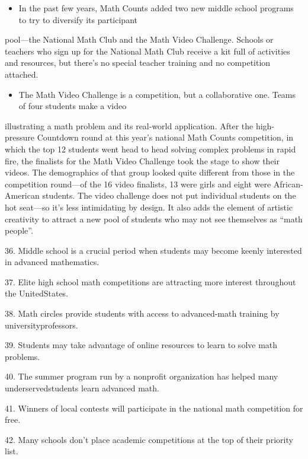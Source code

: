 \documentclass[UTF8,11pt]{ctexart}
\begin{document}
\begin{itemize}[leftmargin=2em,itemsep=.2em,topsep=.4em]\item[N.] In the past few years, Math Counts added two new middle school programs to try to diversify its participant
\end{itemize}

pool---the National Math Club and the Math Video Challenge. Schools or teachers who sign up for the National Math Club receive a kit full of activities and resources, but there’s no special teacher training and no competition attached.


\begin{itemize}[leftmargin=2em,itemsep=.2em,topsep=.4em]\item[O.] The Math Video Challenge is a competition, but a collaborative one. Teams of four students make a video
\end{itemize}

illustrating a math problem and its real-world application. After the high-pressure Countdown round at this year’s national Math Counts competition, in which the top 12 students went head to head solving complex problems in rapid fire, the finalists for the Math Video Challenge took the stage to show their videos. The demographics of that group looked quite different from those in the competition round---of the 16 video finalists, 13 were girls and eight were African-American students. The video challenge does not put individual students on the hot seat---so it’s less intimidating by design. It also adds the element of artistic creativity to attract a new pool of students who may not see themselves as “math people”.


36. Middle school is a crucial period when students may become keenly interested in advanced mathematics.


37. Elite high school math competitions are attracting more interest throughout the UnitedStates.


38. Math circles provide students with access to advanced-math training by universityprofessors.


39. Students may take advantage of online resources to learn to solve math problems.


40. The summer program run by a nonprofit organization has helped many underservedstudents learn advanced math.


41. Winners of local contests will participate in the national math competition for free.


42. Many schools don't place academic competitions at the top of their priority list.
\end{document}
